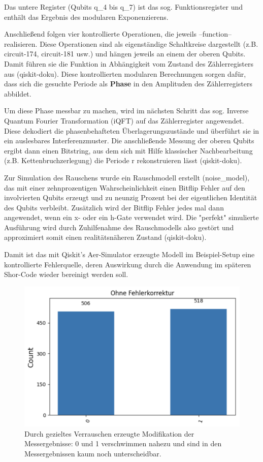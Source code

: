 Das untere Register (Qubits q\_4 bis q\_7) ist das sog. Funktionsregister und enthält das Ergebnis des modularen Exponenzierens.

Anschließend folgen vier kontrollierte Operationen, die jeweils --function-- realisieren. Diese Operationen sind als eigenständige Schaltkreise dargestellt (z.B. circuit-174, circuit-181 usw.) und hängen jeweils an einem der oberen Qubits. Damit führen sie die Funktion in Abhängigkeit vom Zustand des Zählerregisters aus (qiskit-doku). Diese kontrollierten modularen Berechnungen sorgen dafür, dass sich die gesuchte Periode als \textbf{Phase} in den Amplituden des Zählerregisters abbildet.

Um diese Phase messbar zu machen, wird im nächsten Schritt das sog. Inverse Quantum Fourier Transformation (iQFT) auf das Zählerregister angewendet. Diese dekodiert die phasenbehafteten Überlagerungszustände und überführt sie in ein auslesbares Interferenzmuster. Die anschließende Messung der oberen Qubits ergibt dann einen Bitstring, aus dem sich mit Hilfe klassischer Nachbearbeitung (z.B. Kettenbruchzerlegung) die Periode r rekonstruieren lässt (qiskit-doku).

Zur Simulation des Rauschens wurde ein Rauschmodell erstellt (noise\_model), das mit einer zehnprozentigen Wahrscheinlichkeit einen Bitflip Fehler auf den involvierten Qubits erzeugt und zu neunzig Prozent bei der eigentlichen Identität des Qubits verbleibt.
Zusätzlich wird der Bitflip Fehler jedes mal dann angewendet, wenn ein x- oder ein h-Gate verwendet wird.
Die "perfekt" simulierte Ausführung wird durch Zuhilfenahme des Rauschmodells also gestört und approximiert somit einen realitätsnäheren Zustand (qiskit-doku).

Damit ist das mit Qiskit's Aer-Simulator erzeugte Modell im Beispiel-Setup eine kontrollierte Fehlerquelle, deren Auswirkung durch die Anwendung im späteren Shor-Code wieder bereinigt werden soll.

\begin{figure}
    \centering
    \includegraphics[width=0.75\linewidth]{images/praxis-example/result_m_ec.png}
    \caption{Durch gezieltes Verrauschen erzeugte Modifikation der Messergebnisse: 0 und 1 verschwimmen nahezu und sind in den Messergebnissen kaum noch unterscheidbar.}
    \label{fig:modified_results}
\end{figure}

